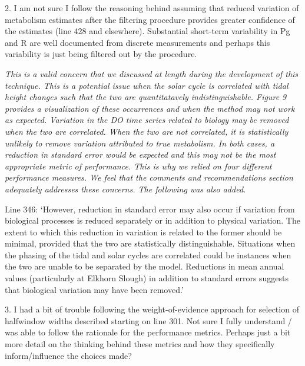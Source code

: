 \documentclass[letterpaper,12pt]{article}\usepackage[]{graphicx}\usepackage[]{color}
\begin{document}
2. I am not sure I follow the reasoning behind assuming that reduced variation of metabolism estimates after the filtering procedure provides greater confidence of the estimates (line 428 and elsewhere). Substantial short-term variability in Pg and R are well documented from discrete measurements and perhaps this variability is just being filtered out by the procedure.

{\it This is a valid concern that we discussed at length during the development of this technique.  This is a potential issue when the solar cycle is correlated with tidal height changes such that the two are quantitatavely indistinguishable.  Figure 9 provides a visualization of these occurrences and when the method may not work as expected. Variation in the DO time series related to biology may be removed when the two are correlated.  When the two are not correlated, it is statistically unlikely to remove variation attributed to true metabolism.  In both cases, a reduction in standard error would be expected and this may not be the most appropriate metric of performance. This is why we relied on four different performance measures. We feel that the comments and recommendations section adequately addresses these concerns.  The following was also added.

Line 346: `However, reduction in standard error may also occur if variation from biological processes is reduced separately or in addition to physical variation.  The extent to which this reduction in variation is related to the former should be minimal, provided that the two are statistically distinguishable.  Situations when the phasing of the tidal and solar cycles are correlated could be instances when the two are unable to be separated by the model.  Reductions in mean annual values (particularly at Elkhorn Slough) in addition to standard errors suggests that biological variation may have been removed.'
}

3. I had a bit of trouble following the weight-of-evidence approach for selection of halfwindow widths described starting on line 301. Not sure I fully understand / was able to follow the rationale for the performance metrics. Perhaps just a bit more detail on the thinking behind these metrics and how they specifically inform/influence the choices made?
\end{document}
